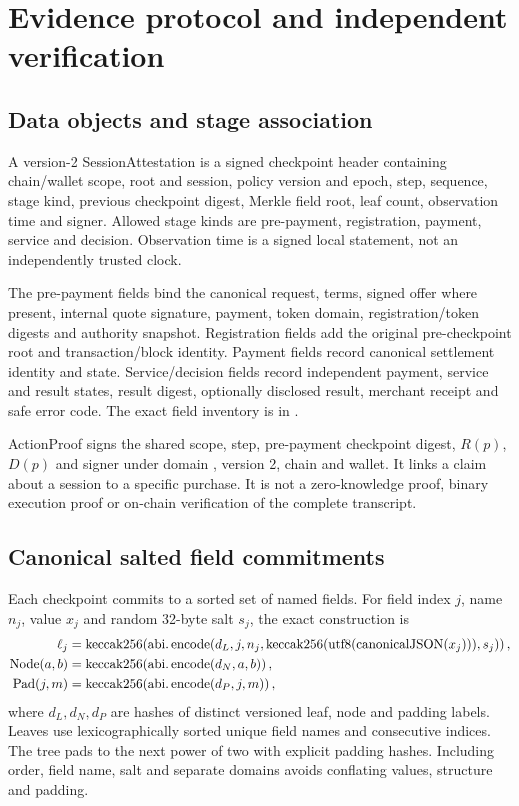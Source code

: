 \section{Evidence protocol and independent verification}\label{sec:evidence}
\subsection{Data objects and stage association}
A version-2 SessionAttestation is a signed checkpoint header containing chain/wallet scope, root and session, policy version and epoch, step, sequence, stage kind, previous checkpoint digest, Merkle field root, leaf count, observation time and signer. Allowed stage kinds are pre-payment, registration, payment, service and decision. Observation time is a signed local statement, not an independently trusted clock.

The pre-payment fields bind the canonical request, terms, signed offer where present, internal quote signature, payment, token domain, registration/token digests and authority snapshot. Registration fields add the original pre-checkpoint root and transaction/block identity. Payment fields record canonical settlement identity and state. Service/decision fields record independent payment, service and result states, result digest, optionally disclosed result, merchant receipt and safe error code. The exact field inventory is in .\sourcecite

ActionProof signs the shared scope, step, pre-payment checkpoint digest, $R(p)$, $D(p)$ and signer under domain , version 2, chain and wallet. It links a claim about a session to a specific purchase. It is not a zero-knowledge proof, binary execution proof or on-chain verification of the complete transcript.


\subsection{Canonical salted field commitments}
Each checkpoint commits to a sorted set of named fields. For field index $j$, name $n_j$, value $x_j$ and random 32-byte salt $s_j$, the exact construction is
\begin{align}
 \ell_j &=\operatorname{keccak256}\!\left(\operatorname{abi.encode}(d_L,j,n_j,\operatorname{keccak256}(\mathrm{utf8}(\operatorname{canonicalJSON}(x_j))),s_j)\right),\label{eq:leaf}\\
 \operatorname{Node}(a,b)&=\operatorname{keccak256}\!\left(\operatorname{abi.encode}(d_N,a,b)\right),\\
 \operatorname{Pad}(j,m)&=\operatorname{keccak256}\!\left(\operatorname{abi.encode}(d_P,j,m)\right),
\end{align}
where $d_L,d_N,d_P$ are hashes of distinct versioned leaf, node and padding labels. Leaves use lexicographically sorted unique field names and consecutive indices. The tree pads to the next power of two with explicit padding hashes. Including order, field name, salt and separate domains avoids conflating values, structure and padding.

